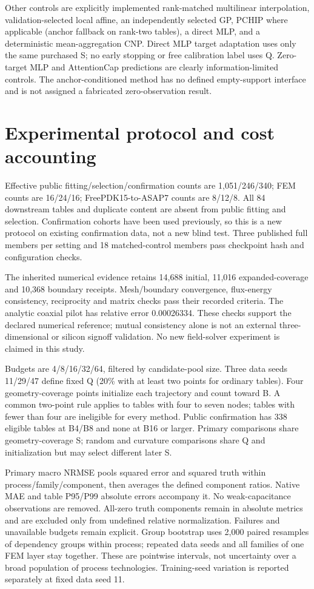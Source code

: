 \documentclass[10pt,twocolumn]{article}
\begin{document}
Other controls are explicitly implemented rank-matched multilinear interpolation, validation-selected local affine, an independently selected GP, PCHIP where applicable (anchor fallback on rank-two tables), a direct MLP, and a deterministic mean-aggregation CNP. Direct MLP target adaptation uses only the same purchased S; no early stopping or free calibration label uses Q. Zero-target MLP and AttentionCap predictions are clearly information-limited controls. The anchor-conditioned method has no defined empty-support interface and is not assigned a fabricated zero-observation result.

\section*{Experimental protocol and cost accounting}

Effective public fitting/selection/confirmation counts are 1,051/246/340; FEM counts are 16/24/16; FreePDK15-to-ASAP7 counts are 8/12/8. All 84 downstream tables and duplicate content are absent from public fitting and selection. Confirmation cohorts have been used previously, so this is a new protocol on existing confirmation data, not a new blind test. Three published full members per setting and 18 matched-control members pass checkpoint hash and configuration checks.

The inherited numerical evidence retains 14,688 initial, 11,016 expanded-coverage and 10,368 boundary receipts. Mesh/boundary convergence, flux-energy consistency, reciprocity and matrix checks pass their recorded criteria. The analytic coaxial pilot has relative error 0.00026334. These checks support the declared numerical reference; mutual consistency alone is not an external three-dimensional or silicon signoff validation. No new field-solver experiment is claimed in this study.

Budgets are 4/8/16/32/64, filtered by candidate-pool size. Three data seeds 11/29/47 define fixed Q (20\% with at least two points for ordinary tables). Four geometry-coverage points initialize each trajectory and count toward B. A common two-point rule applies to tables with four to seven nodes; tables with fewer than four are ineligible for every method. Public confirmation has 338 eligible tables at B4/B8 and none at B16 or larger. Primary comparisons share geometry-coverage S; random and curvature comparisons share Q and initialization but may select different later S.

Primary macro NRMSE pools squared error and squared truth within process/family/component, then averages the defined component ratios. Native MAE and table P95/P99 absolute errors accompany it. No weak-capacitance observations are removed. All-zero truth components remain in absolute metrics and are excluded only from undefined relative normalization. Failures and unavailable budgets remain explicit. Group bootstrap uses 2,000 paired resamples of dependency groups within process; repeated data seeds and all families of one FEM layer stay together. These are pointwise intervals, not uncertainty over a broad population of process technologies. Training-seed variation is reported separately at fixed data seed 11.
\end{document}
